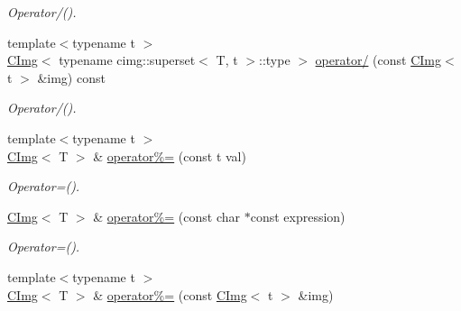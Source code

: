 \begin{DoxyCompactItemize}
\begin{DoxyCompactList}\small\item\em Operator/(). \item\end{DoxyCompactList}\item 
\hypertarget{structcimg__library_1_1CImg_ade803919a697a6153074326049efeb33}{
{\footnotesize template$<$typename t $>$ }\\\hyperlink{structcimg__library_1_1CImg}{CImg}$<$ typename cimg::superset$<$ T, t $>$::type $>$ \hyperlink{structcimg__library_1_1CImg_ade803919a697a6153074326049efeb33}{operator/} (const \hyperlink{structcimg__library_1_1CImg}{CImg}$<$ t $>$ \&img) const }
\label{structcimg__library_1_1CImg_ade803919a697a6153074326049efeb33}

\begin{DoxyCompactList}\small\item\em Operator/(). \item\end{DoxyCompactList}\item 
\hypertarget{structcimg__library_1_1CImg_abc9f7e91e4e25c4df5b49b984bb150db}{
{\footnotesize template$<$typename t $>$ }\\\hyperlink{structcimg__library_1_1CImg}{CImg}$<$ T $>$ \& \hyperlink{structcimg__library_1_1CImg_abc9f7e91e4e25c4df5b49b984bb150db}{operator\%=} (const t val)}
\label{structcimg__library_1_1CImg_abc9f7e91e4e25c4df5b49b984bb150db}

\begin{DoxyCompactList}\small\item\em Operator=(). \item\end{DoxyCompactList}\item 
\hypertarget{structcimg__library_1_1CImg_a0af26f7ac3a69f3d99078eea4d000c0a}{
\hyperlink{structcimg__library_1_1CImg}{CImg}$<$ T $>$ \& \hyperlink{structcimg__library_1_1CImg_a0af26f7ac3a69f3d99078eea4d000c0a}{operator\%=} (const char $\ast$const expression)}
\label{structcimg__library_1_1CImg_a0af26f7ac3a69f3d99078eea4d000c0a}

\begin{DoxyCompactList}\small\item\em Operator=(). \item\end{DoxyCompactList}\item 
\hypertarget{structcimg__library_1_1CImg_ab3adc19f97c3db91bb48c0f9c284c250}{
{\footnotesize template$<$typename t $>$ }\\\hyperlink{structcimg__library_1_1CImg}{CImg}$<$ T $>$ \& \hyperlink{structcimg__library_1_1CImg_ab3adc19f97c3db91bb48c0f9c284c250}{operator\%=} (const \hyperlink{structcimg__library_1_1CImg}{CImg}$<$ t $>$ \&img)}
\label{structcimg__library_1_1CImg_ab3adc19f97c3db91bb48c0f9c284c250}


\end{DoxyCompactItemize}
